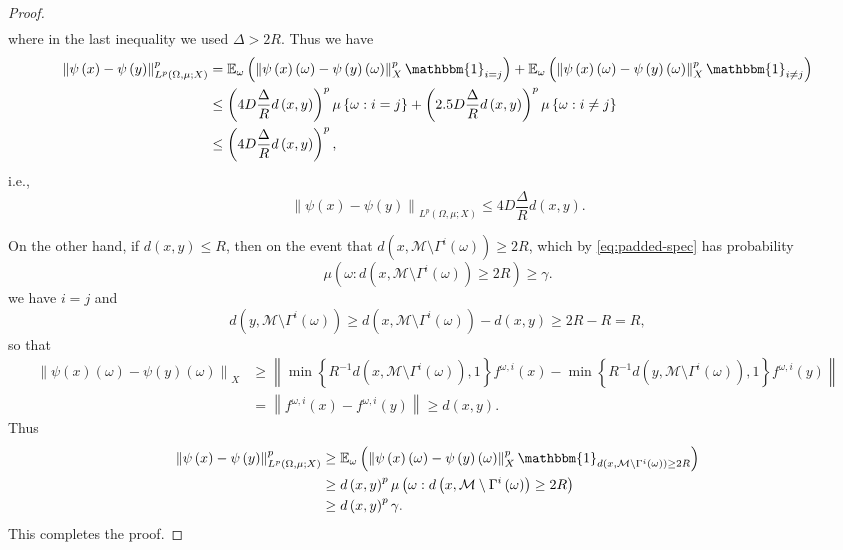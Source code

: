 \documentclass[11pt,reqno]{amsart}
\newcommand{\1}{\mathbf 1}
\begin{document}
\begin{proof}
\begin{align*}
\end{align*}
where in the last inequality we used $\Delta>2R$. Thus we have
\begin{align*}
\left\|\psi\left(x\right)-\psi\left(y\right)\right\|_{L^p\left(\Omega,\mu;X\right)}^p&=\mathbb{E}_\omega \left(\left\|\psi\left(x\right)\left(\omega\right)-\psi\left(y\right)\left(\omega\right)\right\|_X^p\mathbbm{1}_{i=j}\right)+\mathbb{E}_\omega \left(\left\|\psi\left(x\right)\left(\omega\right)-\psi\left(y\right)\left(\omega\right)\right\|_X^p\mathbbm{1}_{i\neq j}\right)\\
&\le \left(4D\frac{\Delta}{R} d\left(x,y\right)\right)^p\mu\left\{\omega:i=j\right\}+\left(2.5D\frac{\Delta}{R} d\left(x,y\right)\right)^p\mu\left\{\omega:i\neq j\right\}\\
&\le \left(4D\frac{\Delta}{R} d\left(x,y\right)\right)^p,
\end{align*}
i.e.,
\[
\left\|\psi\left(x\right)-\psi\left(y\right)\right\|_{L^p\left(\Omega,\mu;X\right)}\le 4D\frac{\Delta}{R} d\left(x,y\right).
\]

On the other hand, if $d\left(x,y\right)\le R$, then on the event that $d\left(x,\mathcal{M}\setminus\Gamma^i\left(\omega\right)\right)\ge 2R$, which by \eqref{eq:padded-spec} has probability
\[
\mu\left(\omega:d\left(x,\mathcal{M}\setminus\Gamma^i\left(\omega\right)\right)\ge 2R\right)\ge \gamma.
\]
we have $i=j$ and
\[
d\left(y,\mathcal{M}\setminus\Gamma^i\left(\omega\right)\right)\ge d\left(x,\mathcal{M}\setminus\Gamma^i\left(\omega\right)\right)-d\left(x,y\right)\ge 2R-R=R,
\]
so that
\begin{align*}
\left\|\psi\left(x\right)\left(\omega\right)-\psi\left(y\right)\left(\omega\right)\right\|_X&\ge \left\|\min\left\{R^{-1}d\left(x,\mathcal{M}\setminus \Gamma^i\left(\omega\right)\right),1\right\}f^{\omega,i}\left(x\right)-\min\left\{R^{-1}d\left(y,\mathcal{M}\setminus \Gamma^i\left(\omega\right)\right),1\right\}f^{\omega,i}\left(y\right)\right\|\\
&=\left\|f^{\omega,i}\left(x\right)-f^{\omega,i}\left(y\right)\right\|\ge  d\left(x,y\right).
\end{align*}
Thus
\begin{align*}
\left\|\psi\left(x\right)-\psi\left(y\right)\right\|_{L^p\left(\Omega,\mu;X\right)}^p&\ge\mathbb{E}_\omega \left(\left\|\psi\left(x\right)\left(\omega\right)-\psi\left(y\right)\left(\omega\right)\right\|_X^p\mathbbm{1}_{d\left(x,\mathcal{M}\setminus\Gamma^i\left(\omega\right)\right)\ge 2R}\right)\\
&\ge d\left(x,y\right)^p\mu\left(\omega:d\left(x,\mathcal{M}\setminus\Gamma^i\left(\omega\right)\right)\ge 2R\right)\\
&\ge d\left(x,y\right)^p\gamma.
\end{align*}
This completes the proof.
\end{proof}
\end{document}
